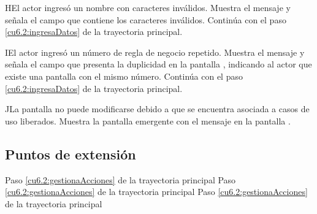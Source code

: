  \begin{UCtrayectoriaA}{H}{El actor ingresó un nombre con caracteres inválidos.}
    \UCpaso[\UCsist] Muestra el mensaje  y señala el campo que contiene los caracteres inválidos.
    \UCpaso[] Continúa con el paso \ref{cu6.2:ingresaDatos} de la trayectoria principal.
 \end{UCtrayectoriaA}
 \begin{UCtrayectoriaA}{I}{El actor ingresó un número de regla de negocio repetido.}
    \UCpaso[\UCsist] Muestra el mensaje  y señala el campo que presenta la duplicidad en la pantalla 
	    , indicando al actor que existe una pantalla con el mismo número.
    \UCpaso[] Continúa con el paso \ref{cu6.2:ingresaDatos} de la trayectoria principal.
 \end{UCtrayectoriaA}
 \begin{UCtrayectoriaA}{J}{La pantalla no puede modificarse debido a que se encuentra asociada a casos de uso liberados.}
    \UCpaso[\UCsist] Muestra la pantalla emergente con el mensaje  en la pantalla .
 \end{UCtrayectoriaA}

\subsection{Puntos de extensión}

	{Paso \ref{cu6.2:gestionaAcciones} de la trayectoria principal}
	{}
	{Paso \ref{cu6.2:gestionaAcciones} de la trayectoria principal}
	{}	
	{Paso \ref{cu6.2:gestionaAcciones} de la trayectoria principal}
	{}